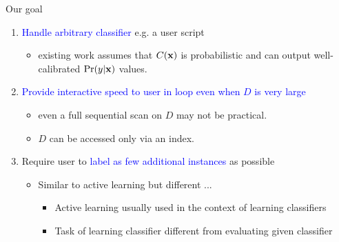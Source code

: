 \documentclass[usenames,dvipsnames, 11pt]{beamer}
\newcommand{\vek}[1]{{\bf {#1}}}
\newcommand{\vx}{{\vek{x}}}
\newlength{\wideitemsep}
\let\olditem\item
\renewcommand{\item}{\setlength{\itemsep}{\wideitemsep}\olditem}
\begin{document}
\begin{frame}{Our goal}
\begin{enumerate}
\pause
\item \textcolor{Blue}{Handle arbitrary classifier} e.g. a user script
  \begin{itemize}
  \item existing work assumes that $C(\vx)$ is probabilistic and can output well-calibrated $\Pr(y|\vx)$ values.
  \end{itemize}
  \pause
\item \textcolor{Blue}{Provide interactive speed to user in loop even when $D$ is very large}
  \begin{itemize}
  \item even a full sequential scan on $D$ may not be practical. 
  \item $D$ can be accessed only via an index.
  \end{itemize}
  \pause
\item Require user to \textcolor{Blue}{label as few additional instances} as possible
  \begin{itemize}
  \item Similar to active learning but different ...
  \begin{itemize}
  \item Active learning usually used in the context of learning classifiers
  \item Task of learning classifier different from evaluating given classifier
  \end{itemize}
  \end{itemize}
  \end{enumerate}
\end{frame}
\end{document}
